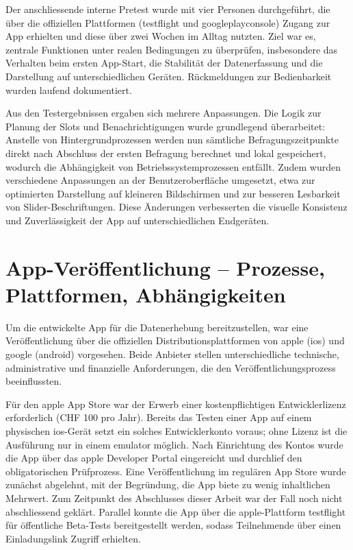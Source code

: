 Der anschliessende interne Pretest wurde mit vier Personen durchgeführt, die über die offiziellen Plattformen (\gls{testflight} und \gls{googleplayconsole}) Zugang zur App erhielten und diese über zwei Wochen im Alltag nutzten. Ziel war es, zentrale Funktionen unter realen Bedingungen zu überprüfen, insbesondere das Verhalten beim ersten App-Start, die Stabilität der Datenerfassung und die Darstellung auf unterschiedlichen Geräten. Rückmeldungen zur Bedienbarkeit wurden laufend dokumentiert.

Aus den Testergebnissen ergaben sich mehrere Anpassungen. Die Logik zur Planung der Slots und Benachrichtigungen wurde grundlegend überarbeitet: Anstelle von Hintergrundprozessen werden nun sämtliche Befragungszeitpunkte direkt nach Abschluss der ersten Befragung berechnet und lokal gespeichert, wodurch die Abhängigkeit von Betriebssystemprozessen entfällt. Zudem wurden verschiedene Anpassungen an der Benutzeroberfläche umgesetzt, etwa zur optimierten Darstellung auf kleineren Bildschirmen und zur besseren Lesbarkeit von Slider-Beschriftungen. Diese Änderungen verbesserten die visuelle Konsistenz und Zuverlässigkeit der App auf unterschiedlichen Endgeräten.

\section{App-Veröffentlichung -- Prozesse, Plattformen, Abhängigkeiten}

Um die entwickelte App für die Datenerhebung bereitzustellen, war eine Veröffentlichung über die offiziellen Distributionsplattformen von \gls{apple} (\gls{ios}) und \gls{google} (\gls{android}) vorgesehen. Beide Anbieter stellen unterschiedliche technische, administrative und finanzielle Anforderungen, die den Veröffentlichungsprozess beeinflussten.

Für den \gls{apple} App Store war der Erwerb einer kostenpflichtigen Entwicklerlizenz erforderlich (CHF 100 pro Jahr). Bereits das Testen einer App auf einem physischen \gls{ios}-Gerät setzt ein solches Entwicklerkonto voraus; ohne Lizenz ist die Ausführung nur in einem \gls{emulator} möglich. Nach Einrichtung des Kontos wurde die App über das \gls{apple} Developer Portal eingereicht und durchlief den obligatorischen Prüfprozess. Eine Veröffentlichung im regulären App Store wurde zunächst abgelehnt, mit der Begründung, die App biete zu wenig inhaltlichen Mehrwert. Zum Zeitpunkt des Abschlusses dieser Arbeit war der Fall noch nicht abschliessend geklärt. Parallel konnte die App über die \gls{apple}-Plattform \gls{testflight} für öffentliche Beta-Tests bereitgestellt werden, sodass Teilnehmende über einen Einladungslink Zugriff erhielten.

